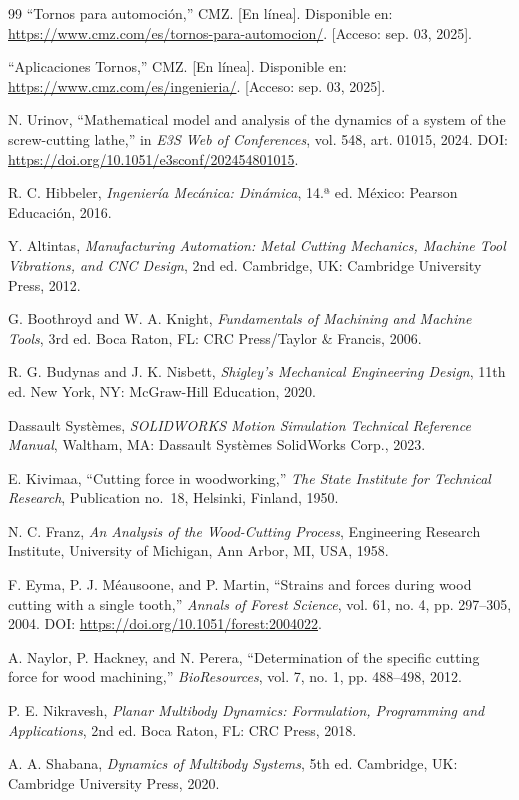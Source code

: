 \documentclass[12pt,a4paper]{article}
\begin{document}
{\begin{thebibliography}{99}
 ``Tornos para automoción,'' CMZ. [En línea]. Disponible en: \url{https://www.cmz.com/es/tornos-para-automocion/}. [Acceso: sep. 03, 2025].

 ``Aplicaciones Tornos,'' CMZ. [En línea]. Disponible en: \url{https://www.cmz.com/es/ingenieria/}. [Acceso: sep. 03, 2025].

 N. Urinov, ``Mathematical model and analysis of the dynamics of a system of the screw-cutting lathe,'' in \textit{E3S Web of Conferences}, vol. 548, art. 01015, 2024. DOI: \url{https://doi.org/10.1051/e3sconf/202454801015}.


 R. C. Hibbeler, \textit{Ingeniería Mecánica: Dinámica}, 14.ª ed. México: Pearson Educación, 2016.

 Y. Altintas, \textit{Manufacturing Automation: Metal Cutting Mechanics, Machine Tool Vibrations, and CNC Design}, 2nd ed. Cambridge, UK: Cambridge University Press, 2012.

 G. Boothroyd and W. A. Knight, \textit{Fundamentals of Machining and Machine Tools}, 3rd ed. Boca Raton, FL: CRC Press/Taylor \& Francis, 2006.

 R. G. Budynas and J. K. Nisbett, \textit{Shigley's Mechanical Engineering Design}, 11th ed. New York, NY: McGraw-Hill Education, 2020.

 Dassault Systèmes, \textit{SOLIDWORKS Motion Simulation Technical Reference Manual}, Waltham, MA: Dassault Systèmes SolidWorks Corp., 2023.

 E. Kivimaa, ``Cutting force in woodworking,'' \textit{The State Institute for Technical Research}, Publication no.~18, Helsinki, Finland, 1950.

 N. C. Franz, \textit{An Analysis of the Wood-Cutting Process}, Engineering Research Institute, University of Michigan, Ann Arbor, MI, USA, 1958.

 F. Eyma, P. J. Méausoone, and P. Martin, ``Strains and forces during wood cutting with a single tooth,'' \textit{Annals of Forest Science}, vol. 61, no. 4, pp. 297--305, 2004. DOI: \url{https://doi.org/10.1051/forest:2004022}.

 A. Naylor, P. Hackney, and N. Perera, ``Determination of the specific cutting force for wood machining,'' \textit{BioResources}, vol. 7, no. 1, pp. 488--498, 2012.

 P. E. Nikravesh, \textit{Planar Multibody Dynamics: Formulation, Programming and Applications}, 2nd ed. Boca Raton, FL: CRC Press, 2018.

 A. A. Shabana, \textit{Dynamics of Multibody Systems}, 5th ed. Cambridge, UK: Cambridge University Press, 2020.

\end{thebibliography}
}
\end{document}
